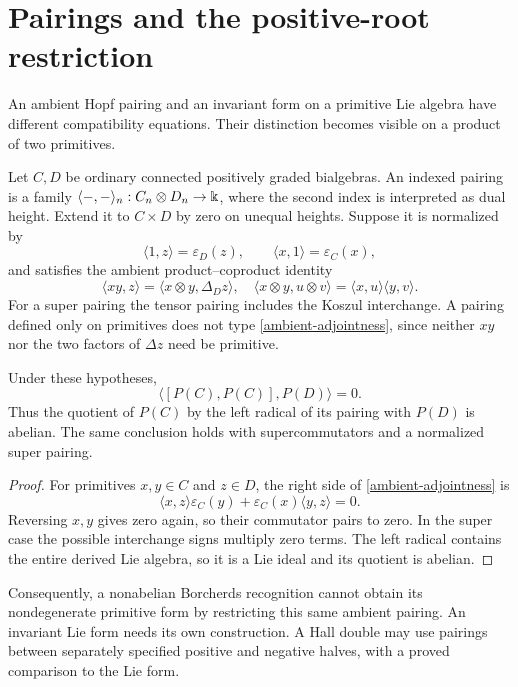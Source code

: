 \section{Pairings and the positive-root restriction}

An ambient Hopf pairing and an invariant form on a primitive Lie algebra
have different compatibility equations.  Their distinction becomes
visible on a product of two primitives.

Let $C,D$ be ordinary connected positively graded bialgebras.
An indexed pairing is a family
$\langle-,-\rangle_n:C_n\otimes D_n\to\Bbbk$, where the second index
is interpreted as dual height.  Extend it to $C\times D$ by zero on
unequal heights.  Suppose it is normalized by
\[
 \langle1,z\rangle=\varepsilon_D(z),\qquad
 \langle x,1\rangle=\varepsilon_C(x),
\]
and satisfies the ambient product--coproduct identity
\begin{equation}
 \langle xy,z\rangle
 =\langle x\otimes y,\Delta_Dz\rangle,
 \quad
 \langle x\otimes y,u\otimes v\rangle
 =\langle x,u\rangle\langle y,v\rangle.
 \label{ambient-adjointness}
\end{equation}
For a super pairing the tensor pairing includes the Koszul interchange.
A pairing defined only on primitives does not type
\eqref{ambient-adjointness}, since neither $xy$ nor the two factors of
$\Delta z$ need be primitive.

\begin{proposition}
\label{primitive-pairing}
Under these hypotheses,
\[
 \langle[P(C),P(C)],P(D)\rangle=0.
\]
Thus the quotient of $P(C)$ by the left radical of its pairing with
$P(D)$ is abelian.  The same conclusion holds with supercommutators
and a normalized super pairing.
\end{proposition}

\begin{proof}
For primitives $x,y\in C$ and $z\in D$, the right side of
\eqref{ambient-adjointness} is
\[
 \langle x,z\rangle\varepsilon_C(y)
 +\varepsilon_C(x)\langle y,z\rangle=0.
\]
Reversing $x,y$ gives zero again, so their commutator pairs to zero.
In the super case the possible interchange signs multiply zero terms.
The left radical contains the entire derived Lie algebra, so it is a
Lie ideal and its quotient is abelian.
\end{proof}

Consequently, a nonabelian Borcherds recognition cannot obtain its
nondegenerate primitive form by restricting this same ambient pairing.
An invariant Lie form needs its own construction.  A Hall double may
use pairings between separately specified positive and negative halves,
with a proved comparison to the Lie form.

